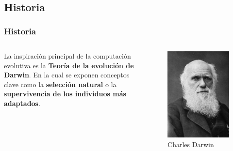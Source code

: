 \documentclass{beamer}
\begin{document}
\subsection{Historia}

\begin{frame}
\frametitle{Historia}

\begin{columns}
La inspiración principal de la computación evolutiva es la \textbf{Teoría de la evolución de Darwin}. En la cual se exponen conceptos clave como la \textbf{selección natural} o la \textbf{supervivencia de los individuos más adaptados}.

\begin{figure}
    \centering
    \includegraphics[scale=0.15]{pres/img/darwin.jpg}
    \caption{Charles Darwin}
    \label{fig:darwin}
\end{figure}
\end{columns}

\end{frame}
\end{document}
